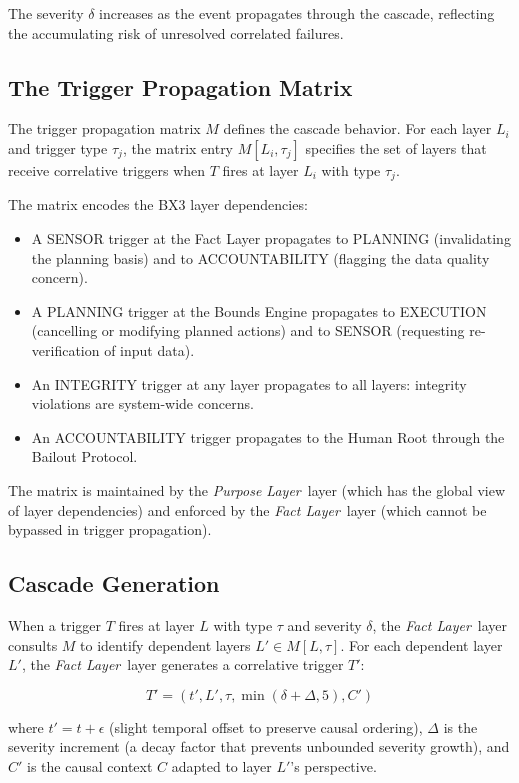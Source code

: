 \documentclass[12pt]{article}
\newcommand{\purpose}{\textit{Purpose Layer}}
\newcommand{\fact}{\textit{Fact Layer}}
\begin{document}
The severity $\delta$ increases as the event propagates through the cascade, reflecting the accumulating risk of unresolved correlated failures.

\subsection{The Trigger Propagation Matrix}

The trigger propagation matrix $M$ defines the cascade behavior. For each layer $L_i$ and trigger type $\tau_j$, the matrix entry $M[L_i, \tau_j]$ specifies the set of layers that receive correlative triggers when $T$ fires at layer $L_i$ with type $\tau_j$.

The matrix encodes the BX3 layer dependencies:

\begin{itemize}[noitemsep]
    \item A SENSOR trigger at the Fact Layer propagates to PLANNING (invalidating the planning basis) and to ACCOUNTABILITY (flagging the data quality concern).
    \item A PLANNING trigger at the Bounds Engine propagates to EXECUTION (cancelling or modifying planned actions) and to SENSOR (requesting re-verification of input data).
    \item An INTEGRITY trigger at any layer propagates to all layers: integrity violations are system-wide concerns.
    \item An ACCOUNTABILITY trigger propagates to the Human Root through the Bailout Protocol.
\end{itemize}

The matrix is maintained by the \purpose\ layer (which has the global view of layer dependencies) and enforced by the \fact\ layer (which cannot be bypassed in trigger propagation).

\subsection{Cascade Generation}

When a trigger $T$ fires at layer $L$ with type $\tau$ and severity $\delta$, the \fact\ layer consults $M$ to identify dependent layers $L' \in M[L, \tau]$. For each dependent layer $L'$, the \fact\ layer generates a correlative trigger $T'$:

$$T' = (t', L', \tau, \min(\delta + \Delta, 5), C')$$

where $t' = t + \epsilon$ (slight temporal offset to preserve causal ordering), $\Delta$ is the severity increment (a decay factor that prevents unbounded severity growth), and $C'$ is the causal context $C$ adapted to layer $L'$'s perspective.
\end{document}
